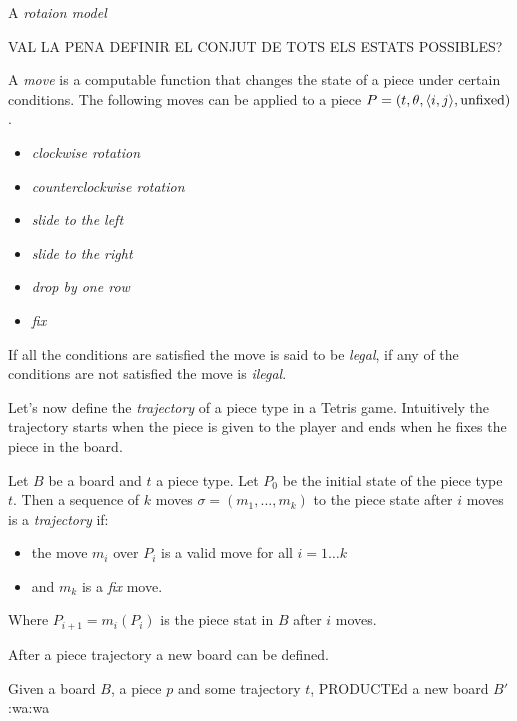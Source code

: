 \begin{definition}
  A \emph{rotaion model}
\end{definition}

VAL LA PENA DEFINIR EL CONJUT DE TOTS ELS ESTATS POSSIBLES?

\begin{definition}
  A \emph{move} is a computable function that changes the state of a piece under certain conditions. The following moves can be applied to a piece $P = \piece[t][\theta][i][j][\text{unfixed}]$. 
  \begin{itemize}
    \item \emph{clockwise rotation}
    \item \emph{counterclockwise rotation}
    \item \emph{slide to the left}
    \item \emph{slide to the right}
    \item \emph{drop by one row}
    \item \emph{fix}
  \end{itemize}
  If all the conditions are satisfied the move is said to be \emph{legal}, if any of the conditions are not satisfied the move is \emph{ilegal}. 
\end{definition}

Let's now define the \emph{trajectory} of a piece type in a Tetris game. Intuitively the trajectory starts when the piece is given to the player  and ends when he fixes the piece in the board.


\begin{definition}
 Let $B$ be a board and $t$ a piece type. Let $P_0$ be the initial state of the piece type $t$. Then a sequence of $k$ moves $\sigma = (m_1, ..., m_k)$ to the piece state after $i$ moves is a \emph{trajectory} if:

 \begin{itemize}
  \item the move $m_i$ over $P_i$ is a valid move for all $i = 1 \dots k$
  \item and $m_k$ is a \emph{fix} move.
 \end{itemize}
 
 Where $P_{i+1} = m_i(P_i)$ is the piece stat in $B$ after $i$ moves.
\end{definition}

After a piece trajectory a new board can be defined.

\begin{definition}
  Given a board $B$, a piece $p$ and some trajectory $t$, PRODUCTEd a new board $B'$ :wa:wa
\end{definition}
